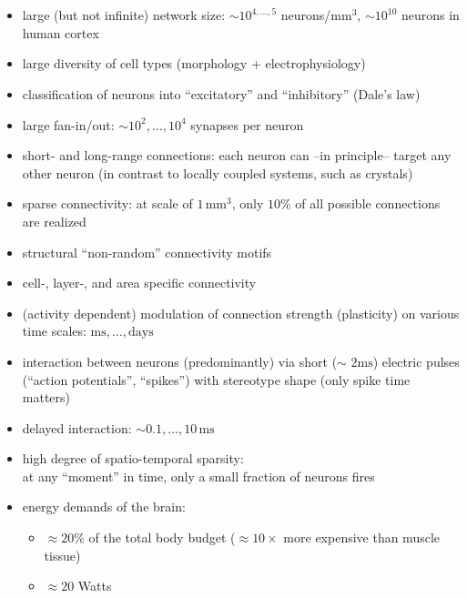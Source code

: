 \documentclass[8pt,t,usepdftitle=false]{beamer}
\begin{document}
\section{\ttl}
\begin{frame}[plain]
  \frametitle{\ttl}
  \framesubtitle{}
    \begin{itemize}
    \itemsep1ex
  \item<1-> large (but not infinite) network size:
    $\sim{}10^{4,\ldots{},5}$ neurons/mm$^3$,
    $\sim{}10^{10}$ neurons in human cortex
  \item<2-> large diversity of cell types (morphology + electrophysiology)
  \item<3-> classification of neurons into ``excitatory'' and ``inhibitory'' (Dale's law)
  \item<4-> large fan-in/out: $\sim{}10^2,\ldots, 10^4$ synapses per neuron
  \item<5-> short- and long-range connections:
    each neuron can --in principle-- target any other neuron 
    (in contrast to locally coupled systems, such as crystals)
  \item<6-> sparse connectivity: at scale of $1\,\text{mm}^3$, 
    only $10\%$ of all possible connections are realized
  \item<7-> structural ``non-random'' connectivity motifs
  \item<8-> cell-, layer-, and area specific connectivity
  \item<9-> (activity dependent) modulation of connection strength (plasticity) 
    on various time scales: $\text{ms},\ldots, \text{days}$
  \item<10-> interaction between neurons (predominantly) via short ($\sim$ $2\text{ms}$) electric pulses (``action potentials'', ``spikes'') with stereotype shape (only spike time matters)
  \item<11-> delayed interaction: $\sim{}0.1,\ldots,10\,\text{ms}$
  \item<12-> high degree of spatio-temporal sparsity:\\
    at any ``moment'' in time, only a small fraction of neurons fires
  \item<13-> energy demands of the brain:
    \begin{itemize}
    \item $\approx{}20\%$ of the total body budget ($\approx{}10\times$ more expensive than muscle tissue)
    \item $\approx{}20$ Watts
    \end{itemize}
  \end{itemize}
\end{frame}
\end{document}
